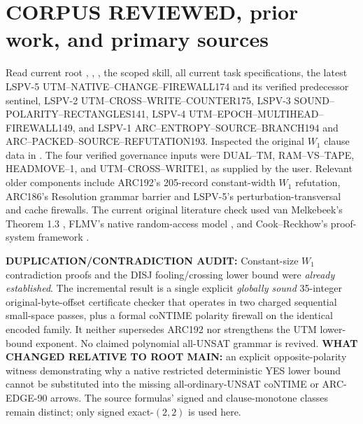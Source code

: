 \documentclass[11pt]{article}
\begin{document}
\section{CORPUS REVIEWED, prior work, and primary sources}
Read current root , , , the scoped  skill, all current task specifications, the latest LSPV-5 UTM--NATIVE--CHANGE--FIREWALL174 and its verified predecessor sentinel, LSPV-2 UTM--CROSS--WRITE--COUNTER175, LSPV-3 SOUND--POLARITY--RECTANGLES141, LSPV-4 UTM--EPOCH--MULTIHEAD--FIREWALL149, and LSPV-1 ARC--ENTROPY--SOURCE--BRANCH194 and ARC--PACKED--SOURCE--REFUTATION193. Inspected the original $W_1$ clause data in . The four verified governance inputs were DUAL--TM, RAM--VS--TAPE, HEADMOVE--1, and UTM--CROSS--WRITE1, as supplied by the user. Relevant older components include ARC192's 205-record constant-width $W_1$ refutation, ARC186's Resolution grammar barrier and LSPV-5's perturbation-transversal and cache firewalls. The current original literature check used van Melkebeek's Theorem 1.3 \cite{vm}, FLMV's native random-access model \cite{flmv}, and Cook--Reckhow's proof-system framework \cite{cr}.

\textbf{DUPLICATION/CONTRADICTION AUDIT:} Constant-size $W_1$ contradiction proofs and the DISJ fooling/crossing lower bound were \emph{already established}. The incremental result is a single explicit \emph{globally sound} 35-integer original-byte-offset certificate checker that operates in two charged sequential small-space passes, plus a formal coNTIME polarity firewall on the identical encoded family. It neither supersedes ARC192 nor strengthens the UTM lower-bound exponent. No claimed polynomial all-UNSAT grammar is revived. \textbf{WHAT CHANGED RELATIVE TO ROOT MAIN:} an explicit opposite-polarity witness demonstrating why a native restricted deterministic YES lower bound cannot be substituted into the missing all-ordinary-UNSAT coNTIME or ARC-EDGE-90 arrows. The source formulas' signed and clause-monotone classes remain distinct; only signed exact-$(2,2)$ is used here.
\end{document}
